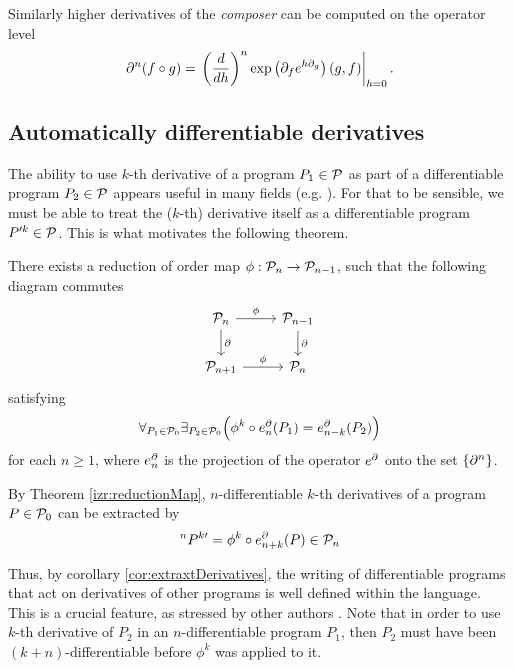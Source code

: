  Similarly higher derivatives of the \emph{composer} can be computed on the
 operator level
 \begin{equation}\label{eq:dkompo}
 \partial^n(f\circ g)=\left.\left(\frac{d}{dh}\right)^n\exp\left(\partial_fe^{h\partial_g}\right)(g,f)\right|_{h=0}.
 \end{equation}

 \subsection{Automatically differentiable derivatives}\label{sec:orderReduction}
 
 The ability to use $k$-th derivative of a program $P_1\in\mathcal{P}$ as part of a differentiable program $P_2\in\mathcal{P}$ appears useful in many fields (e.g. \cite{StatMC}). For that to be sensible, we must be able to treat the ($k$-th) derivative itself as a differentiable program $P^{\prime k}\in\mathcal{P}$. This is what motivates the following theorem. 

\begin{theorem}\label{izr:reductionMap}
There exists a reduction of order map $\phi:\mathcal{P}_n\to \mathcal{P}_{n-1}$, such that the
following  diagram commutes
\begin{equation}\label{eq:reductionMap}
\begin{tikzcd}
  \dP_n \arrow{r}{\phi} \arrow{d}{\D} & 
  \dP_{n-1} \arrow{d}{\D}\\
  \dP_{n+1} \arrow{r}{\phi} & 
  \dP_{n}
\end{tikzcd}
\end{equation}
satisfying
\begin{equation*}
\forall_{P_1\in\mathcal{P}_0}\exists_{P_2\in\mathcal{P}_0}\Big(\phi^k\circ e^\partial_n(P_1)=e^\partial_{n-k}(P_2)\Big)
\end{equation*}
for each $n\ge 1$, where $e^\partial_n$ is the projection of the operator $e^\partial$ onto the set $\{\partial^n\}$.
\end{theorem}  
\begin{corollary}\label{cor:extraxtDerivatives}
By Theorem \ref{izr:reductionMap}, $n$-differentiable $k$-th derivatives of a program $P\in\mathcal{P}_0$ can be extracted by
\begin{equation*}
^{n}P^{k\prime}=\phi^k\circ e^\partial_{n+k}(P)\in\mathcal{P}_n
\end{equation*}
\end{corollary}

Thus, by corollary \ref{cor:extraxtDerivatives}, the writing of differentiable programs that act on derivatives of other programs is well defined within the language. This is a crucial feature, as stressed by other authors \cite{AD1,AD2}. Note that in order to use $k$-th derivative of $P_2$ in an $n$-differentiable program $P_1$, then $P_2$ must have been $(k+n)$-differentiable before $\phi^k$ was applied to it.

